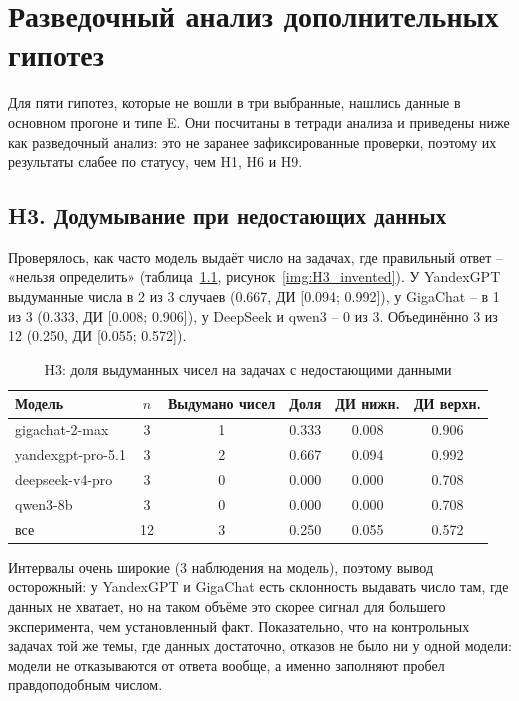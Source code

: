 \documentclass{bmstu}
\begin{document}
\chapter{Разведочный анализ дополнительных гипотез}
\label{ch:explore}

Для пяти гипотез, которые не вошли в три выбранные, нашлись данные в основном прогоне и типе E. Они посчитаны в тетради анализа и приведены ниже как разведочный анализ: это не заранее зафиксированные проверки, поэтому их результаты слабее по статусу, чем H1, H6 и H9.

\section{H3. Додумывание при недостающих данных}
Проверялось, как часто модель выдаёт число на задачах, где правильный ответ -- «нельзя определить» (таблица~\ref{tab:h3}, рисунок~\ref{img:H3_invented}). У YandexGPT выдуманные числа в 2 из 3 случаев (0.667, ДИ [0.094; 0.992]), у GigaChat -- в 1 из 3 (0.333, ДИ [0.008; 0.906]), у DeepSeek и qwen3 -- 0 из 3. Объединённо 3 из 12 (0.250, ДИ [0.055; 0.572]).

\begin{table}[htbp]
\centering
\caption{H3: доля выдуманных чисел на задачах с недостающими данными}
\label{tab:h3}
\begin{tabular}{|l|c|c|c|c|c|}
\hline
Модель & $n$ & Выдумано чисел & Доля & ДИ нижн. & ДИ верхн. \\
\hline
gigachat-2-max & 3 & 1 & 0.333 & 0.008 & 0.906 \\
yandexgpt-pro-5.1 & 3 & 2 & 0.667 & 0.094 & 0.992 \\
deepseek-v4-pro & 3 & 0 & 0.000 & 0.000 & 0.708 \\
qwen3-8b & 3 & 0 & 0.000 & 0.000 & 0.708 \\
все & 12 & 3 & 0.250 & 0.055 & 0.572 \\
\hline
\end{tabular}
\vspace{-10pt}
\end{table}


Интервалы очень широкие (3 наблюдения на модель), поэтому вывод осторожный: у YandexGPT и GigaChat есть склонность выдавать число там, где данных не хватает, но на таком объёме это скорее сигнал для большего эксперимента, чем установленный факт. Показательно, что на контрольных задачах той же темы, где данных достаточно, отказов не было ни у одной модели: модели не отказываются от ответа вообще, а именно заполняют пробел правдоподобным числом.
\end{document}
